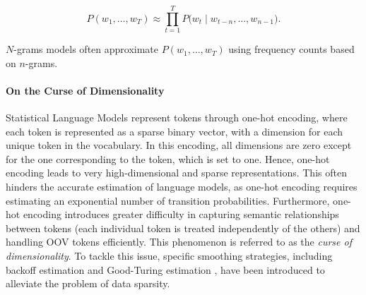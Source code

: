 \begin{equation}
    P(w_1, \ldots, w_T) \approx \prod_{t=1}^{T} P\bigl(w_t \mid w_{t-n}, ..., w_{n-1}\bigr).
    \label{equation:lm-likelihood-markov}
\end{equation}

$N$-grams models often approximate $P(w_1, \ldots, w_T)$ using frequency counts based on $n$-grams. 




\paragraph{On the Curse of Dimensionality} Statistical Language Models represent tokens through one-hot encoding, where each token is represented as a sparse binary vector, with a dimension for each unique token in the vocabulary. In this encoding, all dimensions are zero except for the one corresponding to the token, which is set to one. Hence, one-hot encoding leads to very high-dimensional and sparse representations. This often hinders the accurate estimation of language models, as one-hot encoding requires estimating an exponential number of transition probabilities. Furthermore, one-hot encoding introduces greater difficulty in capturing semantic relationships between tokens (each individual token is treated independently of the others) and handling \ac{OOV} tokens efficiently. This phenomenon is referred to as the \textit{curse of dimensionality}. To tackle this issue, specific smoothing strategies, including backoff estimation \citep{katz1987estimation} and Good-Turing estimation \citep{gale1995good}, have been introduced to alleviate the problem of data sparsity. \\

